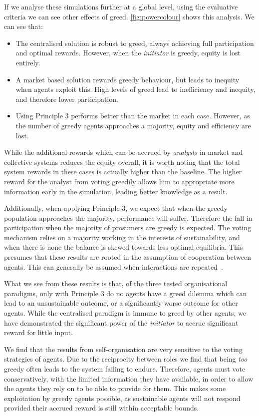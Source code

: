 If we analyse these simulations further at a global level, using the
evaluative criteria we can see other effects of greed.
\autoref{fig:powercolour} shows this analysis. We can see that:

\begin{itemize}
\item The centralised solution is robust to greed, always achieving full participation and optimal rewards. However, when the \emph{initiator} is greedy, equity is lost entirely.
\item A market based solution rewards greedy behaviour, but leads to inequity when agents exploit this. High levels of greed lead to inefficiency and inequity, and therefore lower participation.
\item Using Principle 3 performs better than the market in each case. However, as the number of greedy agents approaches a majority, equity and efficiency are lost.
\end{itemize}

While the additional rewards which can be accrued by \emph{analysts} in market
and collective systems reduces the equity overall, it is worth noting
that the total system rewards in these cases is actually higher than the
baseline. The higher reward for the analyst from voting greedily allows him to
appropriate more information early in the simulation, leading better knowledge
as a result.

Additionally, when applying Principle 3, we expect that when the greedy
population approaches the majority, performance will suffer. Therefore the
fall in participation when the majority of prosumers are greedy is
expected. The voting mechanism relies on a majority working in the interests
of sustainability, and when there is none the balance is skewed towards less
optimal equilibria. This presumes that these results are rooted in the assumption
of cooperation between agents. This can generally be assumed when interactions
are repeated~\citep{Axelrod1984}.

What we see from these results is that, of the three tested organisational
paradigms, only with Principle 3 do no agents have a greed
dilemma which can lead to an unsustainable outcome, or a significantly worse
outcome for other agents. While the centralised paradigm is immune to greed by
other agents, we have demonstrated the significant power of the
\emph{initiator} to accrue significant reward for little input.

We find that the results from self-organisation are very sensitive to the
voting strategies of agents. Due to the reciprocity between roles we find that
being \emph{too} greedy often leads to the system failing to endure. Therefore,
agents must vote conservatively, with the limited information they have
available, in order to allow the agents they rely on to be able to provide for
them. This makes some exploitation by greedy agents possible, as
sustainable agents will not respond provided their accrued reward is still
within acceptable bounds.

